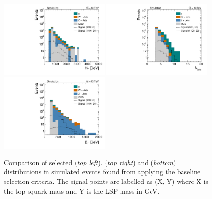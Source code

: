 \begin{figure}[!t]
  \centering
  \begin{minipage}[c]{1.\textwidth}
    \begin{center}
      \includegraphics[width=0.49\textwidth]{figures/Stop_DeltaPhiSelection_HThad.pdf}  
      \includegraphics[width=0.49\textwidth]{figures/Stop_DeltaPhiSelection_N_jets.pdf} \\
      \includegraphics[width=0.49\textwidth]{figures/Stop_DeltaPhiSelection_MET.pdf} 
    \end{center}
  \end{minipage}

  \caption{Comparison of selected \HT (\textit{top left}), \met (\textit{top right}) and \NJets (\textit{bottom}) distributions in simulated events found from applying the baseline selection criteria. The signal points are labelled as (X, Y) where X is the top squark mass and Y is the LSP mass in GeV.}
  \label{fig:stop_baseline} 
\end{figure}
\\
